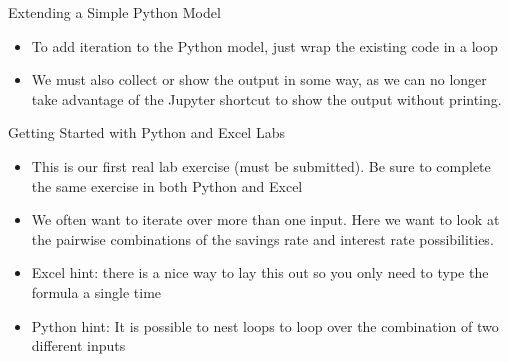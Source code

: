 \documentclass[]{article}
\begin{document}
\begin{section}{Extending a Simple Python Model}
\begin{itemize}
\item To add iteration to the Python model, just wrap the existing code in a loop
\item We must also collect or show the output in some way, as we can no longer take advantage of the Jupyter shortcut to show the output without printing.
\end{itemize}
\end{section}
\begin{section}{Getting Started with Python and Excel Labs}
\begin{itemize}
\item This is our first real lab exercise (must be submitted). Be sure to complete the same exercise in both Python and Excel
\item We often want to iterate over more than one input. Here we want to look at the pairwise combinations of the savings rate and interest rate possibilities.
\item Excel hint: there is a nice way to lay this out so you only need to type the formula a single time
\item Python hint: It is possible to nest loops to loop over the combination of two different inputs
\end{itemize}
\end{section}
\end{document}
